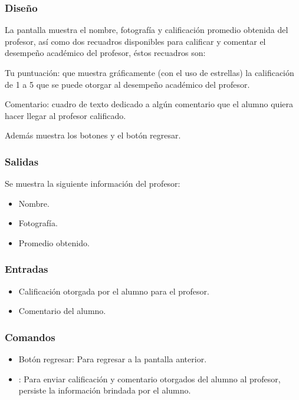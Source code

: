 \subsubsection{Diseño}
	\noindent
	La pantalla muestra el nombre, fotografía y calificación promedio obtenida del profesor, así como dos recuadros disponibles para calificar y comentar el desempeño académico del profesor, éstos recuadros son:
	\begin{Citemize}
		\item Tu puntuación: que muestra gráficamente (con el uso de estrellas) la calificación de 1 a 5 que se puede otorgar al desempeño académico del profesor.
		\item Comentario: cuadro de texto dedicado a algún comentario que el alumno quiera hacer llegar al profesor calificado. 
	\end{Citemize}
	Además muestra los botones  y el botón regresar.

\pagebreak
{}

\subsubsection{Salidas}
	\noindent
	Se muestra la siguiente información del profesor:
	\begin{itemize} 
		\item Nombre.
		\item Fotografía.
		\item Promedio obtenido.
	\end{itemize}

\subsubsection{Entradas}
	\noindent
	\begin{itemize}
		\item Calificación otorgada por el alumno para el profesor.
		\item Comentario del alumno.
	\end{itemize}

\subsubsection{Comandos}
\begin{itemize}
	\item Botón regresar: Para regresar a la pantalla anterior.
	\item {}: Para enviar calificación y comentario otorgados del alumno al profesor, persiste la información brindada por el alumno.
\end{itemize}

